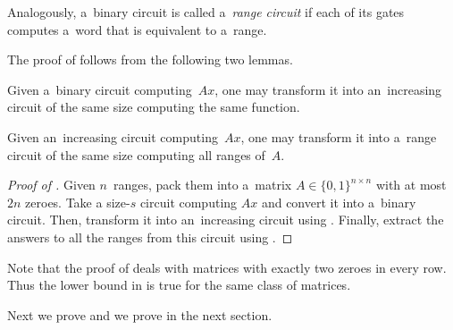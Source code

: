 \documentclass{toc}
\begin{document}
Analogously, a~binary circuit is called a~\emph{range circuit} if each of its gates computes a~word that is equivalent to a~range.

The proof of  follows from the following two lemmas.

\begin{lemma}\label{lemma:correctorder}
    Given a~binary circuit computing~$Ax$, one may transform it into an~increasing circuit of the same size computing the same function.
\end{lemma}

\begin{lemma}\label{lemma:matrixranges}
    Given an~increasing circuit computing~$Ax$, one may transform it into a~range circuit of the same size computing all ranges of~$A$.
\end{lemma}

\begin{proof}[Proof of {}]
    Given $n$~ranges, pack them into a~matrix $A \in \{0,1\}^{n \times n}$ with at most $2n$ zeroes. Take a size-$s$ circuit computing $Ax$ and convert it into a~binary circuit. Then, transform it into an~increasing circuit using . Finally, extract the answers to all the ranges from this circuit using .
\end{proof}

Note that the proof of  deals with matrices with exactly two zeroes in every row. Thus the lower bound in  is true for the same class of matrices.
%
%
%

Next we prove  and we prove  in the next section.
\end{document}
